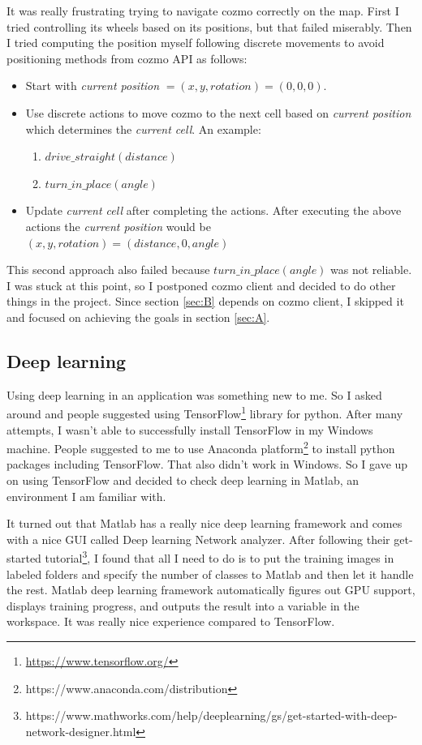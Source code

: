 \documentclass[12pt,a4paper]{article}
\begin{document}
It was really frustrating trying to navigate cozmo correctly on the map. First I tried controlling its wheels based on its positions, but that failed miserably. Then I tried computing the position myself following discrete movements to avoid positioning methods from cozmo API as follows:
\begin{itemize}
\item Start with \textit{current position} $=(x, y, rotation) = (0, 0, 0)$.
\item Use discrete actions to move cozmo to the next cell based on \textit{current position} which determines the \textit{current cell}. An example: 
\begin{enumerate}
\item $drive\_straight(distance)$
\item $turn\_in\_place(angle)$
\end{enumerate}

\item Update \textit{current cell} after completing the actions. After executing the above actions the \textit{current position} would be $(x, y, rotation) = (distance, 0, angle)$
\end{itemize}

This second approach also failed because  $turn\_in\_place(angle)$ was not reliable. I was stuck at this point, so I postponed cozmo client and decided to do other things in the project. Since section \ref{sec:B} depends on cozmo client, I skipped it and focused on achieving the goals in section \ref{sec:A}. 

\subsection{Deep learning}
Using deep learning in an application was something new to me. So I asked around and people suggested using 
 TensorFlow\footnote{\url{https://www.tensorflow.org/}} library for python. After many attempts, I wasn't able to successfully install TensorFlow in my Windows machine. People suggested to me to use Anaconda platform\footnote{https://www.anaconda.com/distribution} to install python packages including TensorFlow. That also didn't work in Windows. So I gave up on using TensorFlow and decided to check deep learning in Matlab, an environment I am familiar with. 
 
It turned out that Matlab has a really nice deep learning framework and comes with  a nice GUI called Deep learning Network analyzer. After following their get-started tutorial\footnote{https://www.mathworks.com/help/deeplearning/gs/get-started-with-deep-network-designer.html}, I found that all I need to do is to put the training images in labeled folders and specify the number of classes to Matlab and then let it handle the rest. Matlab deep learning framework automatically figures out GPU support, displays training progress, and outputs the result into a variable in the workspace.  It was really nice experience compared to TensorFlow. 
\end{document}
